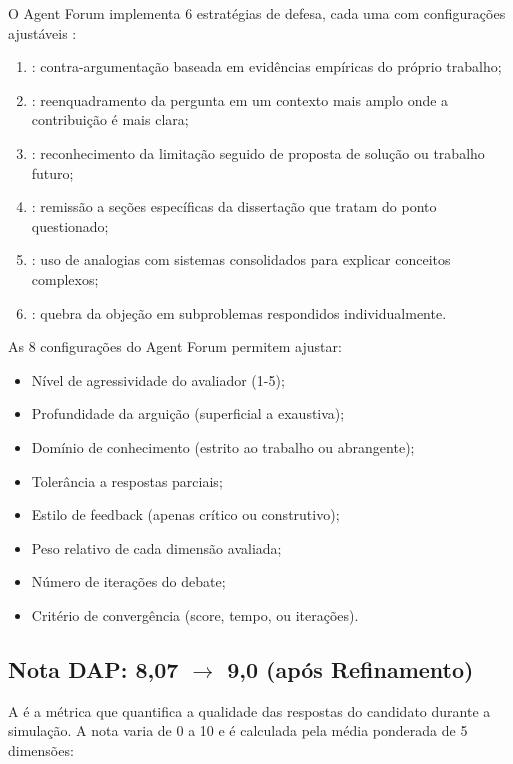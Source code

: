 O Agent Forum implementa 6 estratégias de defesa, cada uma com configurações
ajustáveis \cite{shoham2023multiagent, nash1950equilibrium}:

\begin{enumerate}
\item {}: contra-argumentação baseada em evidências
      empíricas do próprio trabalho;
\item {}: reenquadramento da pergunta em
      um contexto mais amplo onde a contribuição é mais clara;
\item {}: reconhecimento da limitação seguido
      de proposta de solução ou trabalho futuro;
\item {}: remissão a seções específicas da
      dissertação que tratam do ponto questionado;
\item {}: uso de analogias com sistemas
      consolidados para explicar conceitos complexos;
\item {}: quebra da objeção em subproblemas
      respondidos individualmente.
\end{enumerate}

As 8 configurações do Agent Forum permitem ajustar:
\begin{itemize}
\item Nível de agressividade do avaliador (1-5);
\item Profundidade da arguição (superficial a exaustiva);
\item Domínio de conhecimento (estrito ao trabalho ou abrangente);
\item Tolerância a respostas parciais;
\item Estilo de feedback (apenas crítico ou construtivo);
\item Peso relativo de cada dimensão avaliada;
\item Número de iterações do debate;
\item Critério de convergência (score, tempo, ou iterações).
\end{itemize}

\subsection{Nota DAP: 8,07 $\rightarrow$ 9,0 (após Refinamento)}

A  é a métrica que
quantifica a qualidade das respostas do candidato durante a simulação. A nota
varia de 0 a 10 e é calculada pela média ponderada de 5 dimensões:

